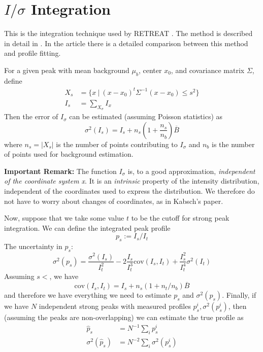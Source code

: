 \documentclass{report}
\newcommand{\cov}{\mathrm{cov}}
\begin{document}
\section{$I/\sigma$ Integration}

This is the integration technique used by RETREAT \cite{retreat-manual}. The method is described in detail in \cite{wilkinson-1988}.
In the article \cite{prince-1997} there is a detailed comparison between this method and profile fitting.

For a given peak with mean background $\mu_b$, center $x_0$, and covariance matrix $\Sigma$, define
\begin{align}
  X_s &= \{ x \ | \ (x-x_0)^t\Sigma^{-1}(x-x_0) \leq s^2\} \\
  I_s &= \sum_{X_\sigma} I_x
\end{align}
Then the error of $I_\sigma$ can be estimated (assuming Poisson statistics) as
\begin{equation}
  \sigma^2(I_s) = I_s + n_s(1+\frac{n_s}{n_b}) \overline{B}
\end{equation}
where $n_s = |X_s|$ is the number of points contributing to $I_\sigma$ and $n_b$ is the number of points used for background estimation.

\textbf{Important Remark:} The function $I_\sigma$ is, to a good approximation, \emph{independent of the coordinate system x}.
It is an \emph{intrinsic} property of the intensity distribution, independent of the coordinates used to express the distribution.
We therefore do not have to worry about changes of coordinates, as in Kabsch's paper.


Now, suppose that we take some value $t$ to be the cutoff for strong peak integration. We can define the integrated peak profile
\begin{equation}
  p_s := I_s / I_t
\end{equation}
The uncertainty in $p_s$:
\begin{equation}
  \sigma^2(p_s) = \frac{\sigma^2(I_s)}{I_t^2} - 2 \frac{I_s}{I_t^3} \cov(I_s, I_t) + \frac{I_s^2}{I_t^4} \sigma^2(I_t)
\end{equation}
Assuming $s < $, we have
\begin{equation}
  \cov(I_s, I_t) = I_s + n_s(1+n_t/n_b)\overline{B}
\end{equation}
and therefore we have everything we need to estimate $p_s$ and $\sigma^2(p_s)$. Finally, if we have $N$ independent strong
peaks with measured profiles $p^i_s, \sigma^2(p^i_s)$, then (assuming the peaks are non-overlapping) we can estimate the
true profile as
\begin{align}
  \hat{p}_s &= N^{-1} \sum_i p^i_s \\
 \sigma^2(\hat{p}_s) &= N^{-2} \sum_i \sigma^2(p^i_s)
\end{align}
\end{document}
